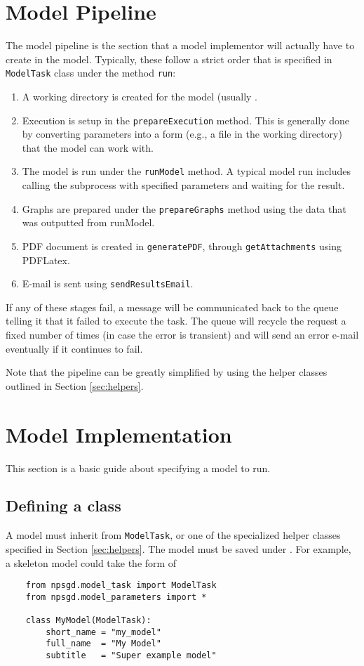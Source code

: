 \documentclass{article}
\newcommand{\mclass}[1]{\sloppy\texttt{#1}}
\newcommand{\mmethod}[1]{\sloppy\texttt{#1}}
\begin{document}
\section{Model Pipeline}
\label{sec:ModelPipeline}
The model pipeline is the section that a model implementor will actually have to
create in the model. Typically, these follow a strict order that is specified in
\mclass{ModelTask} class under the method \mmethod{run}:
\begin{enumerate}
    \item A working directory is created for the model (usually
    . 
    \item Execution is setup in the \mmethod{prepareExecution} method. This is
    generally done by converting parameters into a form (e.g., a file in the
    working directory) that the model can work with.
    \item The model is run under the \mmethod{runModel} method. A typical model
    run includes calling the subprocess with specified parameters and waiting
    for the result.
    \item Graphs are prepared under the \mmethod{prepareGraphs} method using the
    data that was outputted from runModel.
    \item PDF document is created in \mmethod{generatePDF}, through
    \mmethod{getAttachments} using PDFLatex. 
    \item E-mail is sent using \mmethod{sendResultsEmail}.
\end{enumerate}

If any of these stages fail, a message will be communicated back to the queue
telling it that it failed to execute the task. The queue will recycle the request a
fixed number of times (in case the error is transient) and will send an error
e-mail eventually if it continues to fail.

Note that the pipeline can be greatly simplified by using the helper classes 
outlined in Section \ref{sec:helpers}.

\section{Model Implementation}
This section is a basic guide about specifying a model to run.

\subsection{Defining a class}
A model must inherit from \mclass{ModelTask}, or one of
the specialized helper classes specified in Section \ref{sec:helpers}. The model
must be saved under . For example, a skeleton
model could take the form of
\begin{lstlisting}
    from npsgd.model_task import ModelTask
    from npsgd.model_parameters import *

    class MyModel(ModelTask):
        short_name = "my_model"
        full_name  = "My Model"
        subtitle   = "Super example model"
\end{lstlisting}
\end{document}
